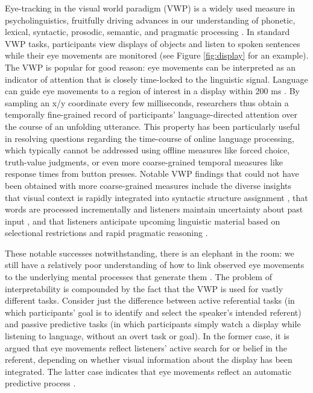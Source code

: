 \documentclass[10pt,letterpaper]{article}
\newcommand{\figref}[1]{Figure \ref{#1}}
\begin{document}
Eye-tracking in the visual world paradigm (VWP) is a widely used measure in psycholinguistics, fruitfully driving advances in our understanding of phonetic, lexical, syntactic, prosodic, semantic, and pragmatic processing  \cite{tanenhaus1995,Allopenna1998,altmann1999,clayards2008,SedivyEtAl1999:Achieving-Incremental-Semantic-,huang2009,kurumada2014}. %
In standard VWP tasks, participants view displays of objects and listen to spoken sentences while their eye movements are monitored (see \figref{fig:display} for an example). The VWP is popular for good reason: eye movements can be interpreted as an indicator of attention that is closely time-locked to the linguistic signal. Language can guide eye movements to a region of interest in a display within 200 ms \cite{Allopenna1998}. By sampling an x/y coordinate every few milliseconds, researchers thus obtain a temporally fine-grained record of participants' language-directed attention over the course of an unfolding utterance. This property has been particularly useful in resolving questions regarding the time-course of online language processing, which typically cannot be addressed using offline measures like forced choice, truth-value judgments, or even more coarse-grained temporal measures like response times from button presses. Notable VWP findings that could not have been obtained with more coarse-grained measures include the diverse insights that visual context is rapidly integrated into syntactic structure assignment \cite{tanenhaus1995}, %
that words are processed incrementally and listeners maintain uncertainty about past input \cite{Allopenna1998,clayards2008}, and that listeners anticipate upcoming linguistic material based on selectional restrictions and rapid pragmatic reasoning \cite{altmann1999,SedivyEtAl1999:Achieving-Incremental-Semantic-}. 


These notable successes notwithstanding, there is an elephant in the room: we still have a relatively poor understanding of how to link observed eye movements to the underlying mental processes that generate them \cite{SalverdaTanenhaus2017:The-Visual-World-Paradigm, tanenhaus2000eye, Allopenna1998, magnuson2019fixations}. The problem of interpretability  is compounded by the fact that the VWP is used for vastly different tasks. Consider just the difference between active referential tasks (in which participants' goal is to identify and select the speaker's intended referent) and passive predictive tasks (in which participants simply watch a display while listening to language, without an overt task or goal). In the former case, it is argued that eye movements reflect listeners' active search for or belief in the referent, depending on whether visual information about the display has been integrated. The latter case indicates that eye movements reflect an automatic predictive process \cite{altmann1999}. %
\end{document}
